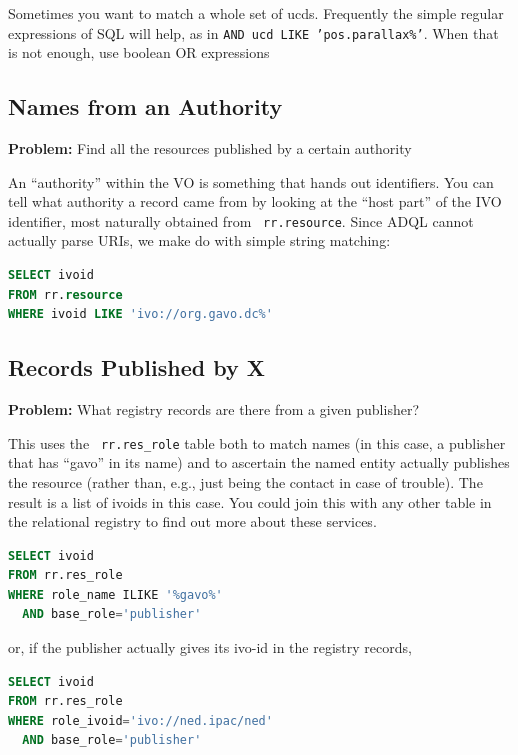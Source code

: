 \documentclass[11pt,a4paper]{ivoa}
\newcommand{\rtent}[1]{\texttt{\color{rtcolor} #1}}
\begin{document}
Sometimes you want to match a whole set of ucds.  Frequently the
simple regular expressions of SQL will help, as in 
\texttt{AND ucd LIKE 'pos.parallax\%'}.  When that is not enough, 
use boolean OR expressions 

\subsection{Names from an Authority}

\textbf{Problem:} Find all the resources published by a certain
authority

An ``authority'' within the VO is something that hands out identifiers.
You can tell what authority a record came from by looking at the ``host
part'' of the IVO identifier, most naturally obtained from 
\rtent{rr.resource}.  Since ADQL cannot actually parse
URIs, we make do with simple string matching:


\begin{lstlisting}[language=SQL,flexiblecolumns=true]
SELECT ivoid 
FROM rr.resource
WHERE ivoid LIKE 'ivo://org.gavo.dc%'
\end{lstlisting}

\subsection{Records Published by X}

\textbf{Problem:} What registry records are there from a given
publisher?

This uses the 
\rtent{rr.res\_role}
 table both to
match names (in this case, a publisher that has ``gavo'' in its name) and
to ascertain the named entity actually publishes the resource (rather
than, e.g., just being the contact in case of trouble).  The result is a
list of ivoids in this case.  You could join this with any other
table in the relational registry to find out more about these
services.


\begin{lstlisting}[language=SQL,flexiblecolumns=true]
SELECT ivoid 
FROM rr.res_role
WHERE role_name ILIKE '%gavo%'
  AND base_role='publisher'
\end{lstlisting}

or, if the publisher actually gives its ivo-id in the registry
records,


\begin{lstlisting}[language=SQL,flexiblecolumns=true]
SELECT ivoid 
FROM rr.res_role
WHERE role_ivoid='ivo://ned.ipac/ned'
  AND base_role='publisher'
\end{lstlisting}
\end{document}
